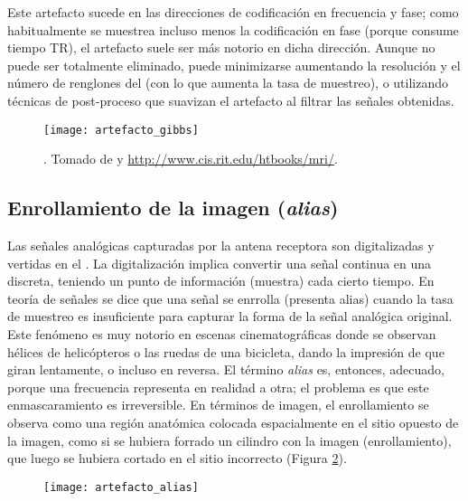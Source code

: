 Este artefacto sucede en las direcciones de codificación en frecuencia y fase; como habitualmente se muestrea incluso menos la codificación en fase (porque consume tiempo TR), el artefacto suele ser más notorio en dicha dirección. Aunque no puede ser totalmente eliminado, puede minimizarse aumentando la resolución y el número de renglones del \espaciok (con lo que aumenta la tasa de muestreo), o utilizando técnicas de post-proceso que suavizan el artefacto al filtrar las señales obtenidas. 

\begin{figure}[htb]
 \begin{figg}
   \texttt{[image: artefacto\_gibbs]}
   \caption{\figurapendiente. Tomado de \cite{gallagher2008fourier} y \url{http://www.cis.rit.edu/htbooks/mri/}.}
 \label{fig:artefacto_gibbs}
 \end{figg}
\end{figure}



\subsection{Enrollamiento de la imagen (\textit{alias})}
Las señales analógicas capturadas por la antena receptora son digitalizadas y vertidas en el \espaciok. La digitalización implica convertir una señal continua en una discreta, teniendo un punto de información (muestra) cada cierto tiempo. En teoría de señales se dice que una señal se enrrolla (presenta alias) cuando la tasa de muestreo es insuficiente para capturar la forma de la señal analógica original. Este fenómeno es muy notorio en escenas cinematográficas donde se observan hélices de helicópteros o las ruedas de una bicicleta, dando la impresión de que giran lentamente, o incluso en reversa. El término \textit{alias} es, entonces, adecuado, porque una frecuencia representa en realidad a otra; el problema es que este enmascaramiento es irreversible.  En términos de imagen, el enrollamiento se observa como una región anatómica colocada espacialmente en el sitio opuesto de la imagen, como si se hubiera forrado un cilindro con la imagen (enrollamiento), que luego se hubiera cortado en el sitio incorrecto (Figura \ref{fig:artefacto_alias}).

\begin{figure}[htb]
 \begin{figg}
   \texttt{[image: artefacto\_alias]}
   \caption{\figurapendiente }
 \label{fig:artefacto_alias}
 \end{figg}
\end{figure}


